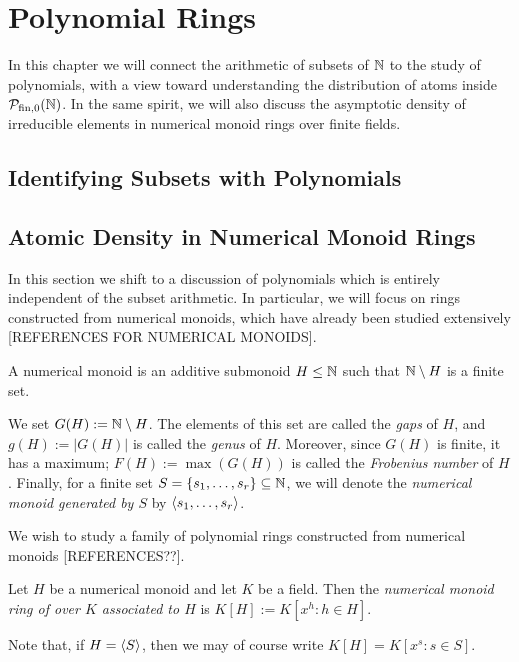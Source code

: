 \chapter{Polynomial Rings}

In this chapter we will connect the arithmetic of subsets of $\mathbb{N}$ to the study of polynomials, with a view toward understanding the distribution of atoms inside ${\mathcal{P}_{\textrm{fin},0}(\mathbb{N})}$.
In the same spirit, we will also discuss the asymptotic density of irreducible elements in numerical monoid rings over finite fields.

\section{Identifying Subsets with Polynomials}




\section{Atomic Density in Numerical Monoid Rings}

In this section we shift to a discussion of polynomials which is entirely independent of the subset arithmetic.
In particular, we will focus on rings constructed from numerical monoids, which have already been studied extensively [REFERENCES FOR NUMERICAL MONOIDS].  

\begin{defn}
A numerical monoid is an additive submonoid $H \le \mathbb{N}$ such that $\mathbb{N}\setminus H$ is a finite set.  

We set $G(H) := \mathbb{N} \setminus H$. 
The elements of this set are called the \textit{gaps} of $H$, and $g(H) := |G(H)|$ is called the \textit{genus} of $H$.
Moreover, since $G(H)$ is finite, it has a maximum; $F(H) := \max(G(H))$ is called the \textit{Frobenius number} of $H$.
Finally, for a finite set $S = \{s_1,\dots, s_r\}\subseteq \mathbb{N}$, we will denote the \textit{numerical monoid generated by $S$} by $\langle s_1,\dots,s_r \rangle$.
\end{defn}


We wish to study a family of polynomial rings constructed from numerical monoids [REFERENCES??].

\begin{defn}
Let $H$ be a numerical monoid and let $K$ be a field.
Then the \textit{numerical monoid ring of over $K$ associated to $H$} is $K[H] := K[x^h : h\in H]$.

Note that, if $H = \langle S \rangle$, then we may of course write $K[H] = K[x^s: s\in S]$.


\end{defn}


